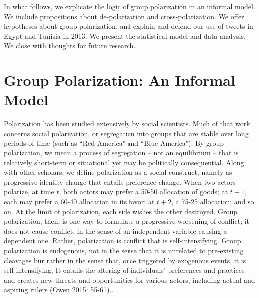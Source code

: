 \documentclass[12pt]{article}
\begin{document}
In what follows, we explicate the logic of group polarization in an informal model.  We include propositions about de-polarization and cross-polarization.  We offer hypotheses about group polarization, and explain and defend our use of tweets in Egypt and Tunisia in 2013.  We present the statistical model and data analysis.  We close with thoughts for future research.


\section*{Group Polarization: An Informal Model}
Polarization has been studied extensively by social scientists.  Much of that work concerns social polarization, or segregation into groups that are stable over long periods of time (such as ``Red America" and ``Blue America").   By group polarization, we mean a process of segregation – not an equilibrium – that is relatively short-term or situational yet may be politically consequential.   Along with other scholars, we define polarization as a social construct, namely as progressive identity change that entails preference change.   When two actors polarize, at time $t$, both actors may prefer a 50-50 allocation of goods; at $t+1$, each may prefer a 60-40 allocation in its favor; at $t+2$, a 75-25 allocation; and so on.  At the limit of polarization, each side wishes the other destroyed.   Group polarization, then, is one way to formulate a progressive worsening of conflict; it does not cause conflict, in the sense of an independent variable causing a dependent one.  Rather, polarization is conflict that is self-intensifying.  Group polarization is endogenous, not in the sense that it is unrelated to pre-existing cleavages bur rather in the sense that, once triggered by exogenous events, it is self-intensifying.   It entails the altering of individuals' preferences and practices and creates new threats and opportunities for various actors, including actual and aspiring rulers (Owen 2015: 55-61)..  
\end{document}
